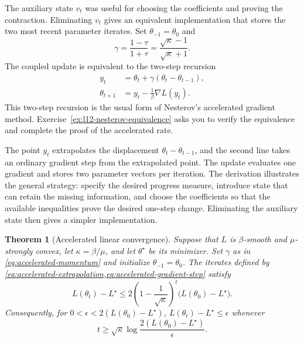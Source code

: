 \documentclass[11pt,twoside]{article}
\newtheorem{theorem}{Theorem}[section]
\theoremstyle{definition}
\theoremstyle{remark}
\begin{document}
The auxiliary state $v_t$ was useful for choosing the coefficients and proving
the contraction. Eliminating $v_t$ gives an equivalent implementation that
stores the two most recent parameter iterates. Set $\theta_{-1}=\theta_0$ and
\begin{equation}
 \gamma=\frac{1-\tau}{1+\tau}
 =\frac{\sqrt\kappa-1}{\sqrt\kappa+1}.
 \label{eq:accelerated-momentum}
\end{equation}
The coupled update is equivalent to the two-step recursion
\begin{align}
 y_t&=\theta_t+\gamma(\theta_t-\theta_{t-1}),
 \label{eq:accelerated-extrapolation}\\
 \theta_{t+1}&=y_t-\frac1\beta\nabla L(y_t).
 \label{eq:accelerated-gradient-step}
\end{align}
This two-step recursion is the usual form of Nesterov's accelerated gradient
method. Exercise~\ref{ex:l12-nesterov-equivalence} asks you to verify the
equivalence and complete the proof of the accelerated rate.

The point $y_t$ extrapolates the displacement
$\theta_t-\theta_{t-1}$, and the second line takes an ordinary gradient step
from the extrapolated point. The update evaluates one gradient and stores two
parameter vectors per iteration.
The derivation illustrates the general strategy: specify the desired progress
measure, introduce state that can retain the missing information, and choose
the coefficients so that the available inequalities prove the desired
one-step change. Eliminating the auxiliary state then gives a simpler
implementation.

\begin{theorem}[Accelerated linear convergence]
\label{thm:accelerated-strongly-convex}
Suppose that $L$ is $\beta$-smooth and $\mu$-strongly convex, let
$\kappa=\beta/\mu$, and let $\theta^\star$ be its minimizer. Set $\gamma$ as
in \cref{eq:accelerated-momentum} and initialize $\theta_{-1}=\theta_0$. The
iterates defined by
\cref{eq:accelerated-extrapolation,eq:accelerated-gradient-step} satisfy
\begin{equation}
 L(\theta_t)-L^\star
 \le 2\left(1-\frac1{\sqrt\kappa}\right)^t
 \bigl(L(\theta_0)-L^\star\bigr).
 \label{eq:accelerated-linear-rate}
\end{equation}
Consequently, for
$0<\epsilon<2(L(\theta_0)-L^\star)$,
$L(\theta_t)-L^\star\le\epsilon$ whenever
\begin{equation}
 t\ge \sqrt\kappa
 \log\frac{2(L(\theta_0)-L^\star)}{\epsilon}.
 \label{eq:accelerated-strong-rate}
\end{equation}
\end{theorem}
\end{document}
